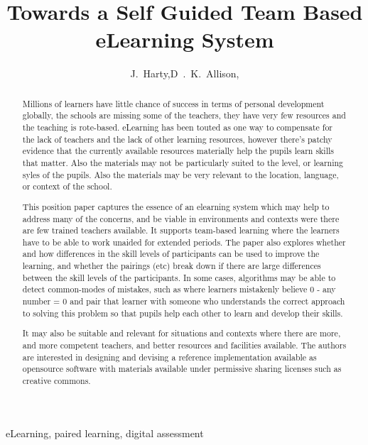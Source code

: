 \documentclass[11pt]{IEEEtran}
\begin{document}
\title{Towards a Self Guided Team Based eLearning System}

\author{J.~Harty,D~.~K.~Allison,}

\maketitle


\begin{abstract}
Millions of learners have little chance of success in terms of personal 
development globally, the schools are missing some of the teachers, they have 
very few resources and the teaching is rote-based. eLearning has been touted as 
one way to compensate for the lack of teachers and the lack of other learning
resources, however there's patchy evidence that the currently available 
resources materially help the pupils learn skills that matter. Also the 
materials may not be particularly suited to the level, or learning syles of the 
pupils. Also the materials may be very relevant to the location, language, or 
context of the school.

This position paper captures the essence of an elearning system which may help 
to address many of the concerns, and be viable in environments and contexts were
there are few trained teachers available. It supports team-based learning where 
the learners have to be able to work unaided for extended periods. The paper 
also explores whether and how differences in the skill levels of participants 
can be used to improve the learning, and whether the pairings (etc) break down 
if there are large differences between the skill levels of the participants. In 
some cases, algorithms may be able to detect common-modes of mistakes, such as 
where learners mistakenly believe 0 - any number = 0 and pair that learner with 
someone who understands the correct approach to solving this problem so that 
pupils help each other to learn and develop their skills.

It may also be suitable and relevant for situations and contexts where there are
more, and more competent teachers, and better resources and facilities 
available. The authors are interested in designing and devising a reference
implementation available as opensource software with materials available under
permissive sharing licenses such as creative commons.
\end{abstract}

\begin{IEEEkeywords}
eLearning, paired learning, digital assessment
\end{IEEEkeywords}
\end{document}
